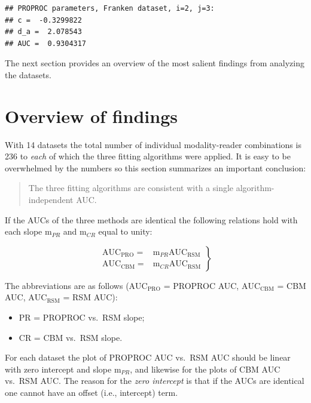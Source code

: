 \documentclass[
]{book}
\providecommand{\tightlist}{%
  \setlength{\itemsep}{0pt}\setlength{\parskip}{0pt}}
\begin{document}
\begin{verbatim}
## PROPROC parameters, Franken dataset, i=2, j=3: 
## c =  -0.3299822 
## d_a =  2.078543 
## AUC =  0.9304317
\end{verbatim}

The next section provides an overview of the most salient findings from analyzing the datasets.

\hypertarget{rsm-3-fits-overview}{%
\section{Overview of findings}\label{rsm-3-fits-overview}}

With 14 datasets the total number of individual modality-reader combinations is 236 to \emph{each} of which the three fitting algorithms were applied. It is easy to be overwhelmed by the numbers so this section summarizes an important conclusion:

\begin{quote}
The three fitting algorithms are consistent with a single algorithm-independent AUC.
\end{quote}

If the AUCs of the three methods are identical the following relations hold with each slope \(\text{m}_{PR}\) and \(\text{m}_{CR}\) equal to unity:

\begin{equation}
\left. 
\begin{aligned}
\text{AUC}_{\text{PRO}} =& \text{m}_{PR} \text{AUC}_{\text{RSM}}  \\
\text{AUC}_{\text{CBM}} =& \text{m}_{CR} \text{AUC}_{\text{RSM}}
\end{aligned}
\right \}
\label{eq:rsm-3-fits-slopes-equation1}
\end{equation}

The abbreviations are as follows (\(\text{AUC}_\text{PRO}\) = PROPROC AUC, \(\text{AUC}_\text{CBM}\) = CBM AUC, \(\text{AUC}_\text{RSM}\) = RSM AUC):

\begin{itemize}
\tightlist
\item
  PR = PROPROC vs.~RSM slope;
\item
  CR = CBM vs.~RSM slope.
\end{itemize}

For each dataset the plot of PROPROC AUC vs.~RSM AUC should be linear with zero intercept and slope \(\text{m}_{PR}\), and likewise for the plots of CBM AUC vs.~RSM AUC. The reason for the \emph{zero intercept} is that if the AUCs are identical one cannot have an offset (i.e., intercept) term.
\end{document}
